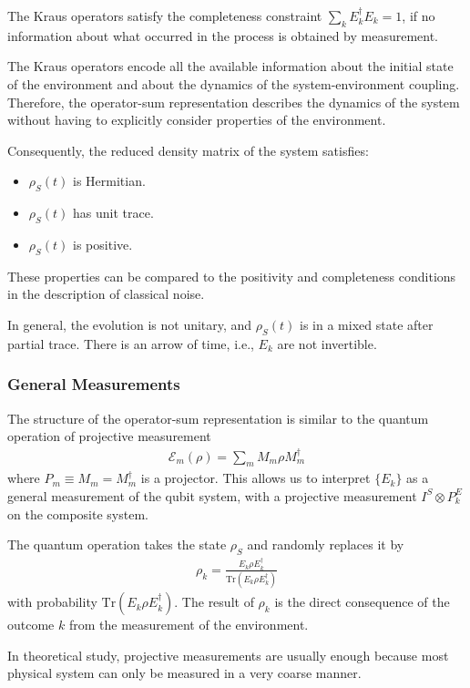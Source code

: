 The Kraus operators satisfy the completeness constraint $\displaystyle \sum_k E_k^\dagger E_k=1$, if no information about what occurred in the process is obtained by measurement.

The Kraus operators encode all the available information about the initial state of the environment and about the dynamics of the system-environment coupling. Therefore, the operator-sum representation describes the dynamics of the system without having to explicitly consider properties of the environment.

Consequently, the reduced density matrix of the system satisfies:
\begin{itemize}
    \item $\rho_S(t)$ is Hermitian.
    \item $\rho_S(t)$ has unit trace.
    \item $\rho_S(t)$ is positive.
\end{itemize}
These properties can be compared to the positivity and completeness conditions in the description of classical noise.

In general, the evolution is not unitary, and $\rho_S(t)$ is in a mixed state after partial trace. There is an arrow of time, i.e., $E_k$ are not invertible. 

\subsubsection{General Measurements}
The structure of the operator-sum representation is similar to the quantum operation of projective measurement
\begin{align*}
    \mathcal{E}_m(\rho)=\sum_m M_m \rho M_m^\dagger
\end{align*}
where $P_m\equiv M_m=M_m^\dagger$ is a projector. This allows us to interpret $\{ E_k \}$ as a general measurement of the qubit system, with a projective measurement $I^S \otimes P_k^E$ on the composite system. 

The quantum operation takes the state $\rho_S$ and randomly replaces it by
\begin{align*}
    \rho_k=\frac{E_k\rho E_k^\dagger}{\mathrm{Tr}(E_k\rho E_k^\dagger)}
\end{align*}
with probability $\mathrm{Tr}(E_k\rho E_k^\dagger)$. The result of $\rho_k$ is the direct consequence of the outcome $k$ from the measurement of the environment.

In theoretical study, projective measurements are usually enough because most physical system can only be measured in a very coarse manner.

